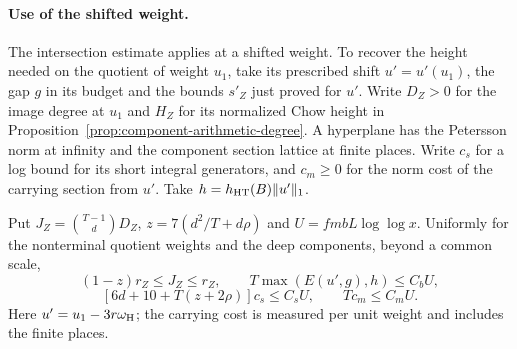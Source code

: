 

\paragraph{Use of the shifted weight.}
The intersection estimate applies at a shifted weight. To recover the height needed on the quotient of weight \(u_1\), take its prescribed
shift \(u'=u'(u_1)\), the gap \(g\) in its budget and the
bounds \(s'_Z\) just proved for \(u'\). Write \(D_Z>0\)
for the image degree at \(u_1\) and \(H_Z\) for its normalized Chow
height in Proposition~\ref{prop:component-arithmetic-degree}. A hyperplane
has the Petersson norm at infinity and the component section lattice
at finite places. Write \(c_s\) for a log bound for its short integral
generators, and \(c_m\ge0\) for the norm cost of the carrying
section from \(u'\). Take \(h=h_{\rm HT}(B)\|u'\|_1\).
\begin{established}\label{hyp:covolume-shift-costs}
Put \(J_Z=\binom{T-1}{d}D_Z\), \(z=7(d^2/T+d\rho)\) and
\(U=fmbL\log\log x\). Uniformly for the nonterminal quotient weights and the deep components, beyond a common scale,
\[
  (1-z)r_Z\le J_Z\le r_Z,\qquad
  T\max(E(u',g),h)\le C_b U,
\]
\[
    [6d+10+T(z+2\rho)]c_s\le C_sU,\qquad Tc_m\le C_mU.
\]
Here \(u'=u_1-3r\omega_{\rm H}\); the carrying cost is measured per unit weight and includes the finite places.
\end{established}
